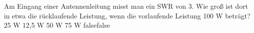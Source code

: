     {Am Eingang einer Antennenleitung misst man ein SWR von 3. Wie groß ist dort in etwa die rücklaufende Leistung, wenn die vorlaufende Leistung 100 W beträgt?}
    {25 W}
    {12,5 W}
    {50 W}
    {75 W}
    {false}{false}